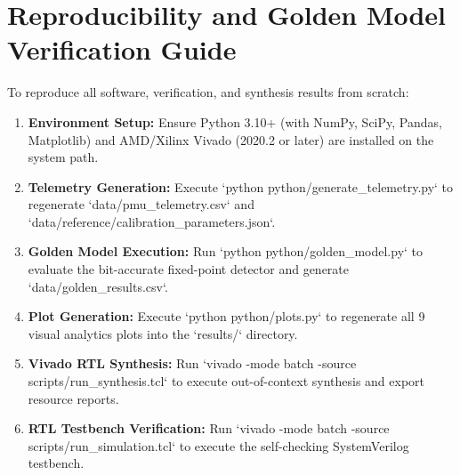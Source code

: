 \documentclass[12pt,a4paper]{report}
\begin{document}
\chapter{Reproducibility and Golden Model Verification Guide}
To reproduce all software, verification, and synthesis results from scratch:
\begin{enumerate}
    \item \textbf{Environment Setup:} Ensure Python 3.10+ (with NumPy, SciPy, Pandas, Matplotlib)
    and AMD/Xilinx Vivado (2020.2 or later) are installed on the system path.
    \item \textbf{Telemetry Generation:} Execute `python python/generate_telemetry.py` to regenerate
    `data/pmu_telemetry.csv` and `data/reference/calibration_parameters.json`.
    \item \textbf{Golden Model Execution:} Run `python python/golden_model.py` to evaluate
    the bit-accurate fixed-point detector and generate `data/golden_results.csv`.
    \item \textbf{Plot Generation:} Execute `python python/plots.py` to regenerate all 9 visual
    analytics plots into the `results/` directory.
    \item \textbf{Vivado RTL Synthesis:} Run `vivado -mode batch -source scripts/run_synthesis.tcl`
    to execute out-of-context synthesis and export resource reports.
    \item \textbf{RTL Testbench Verification:} Run `vivado -mode batch -source scripts/run_simulation.tcl`
    to execute the self-checking SystemVerilog testbench.
\end{enumerate}
\end{document}
